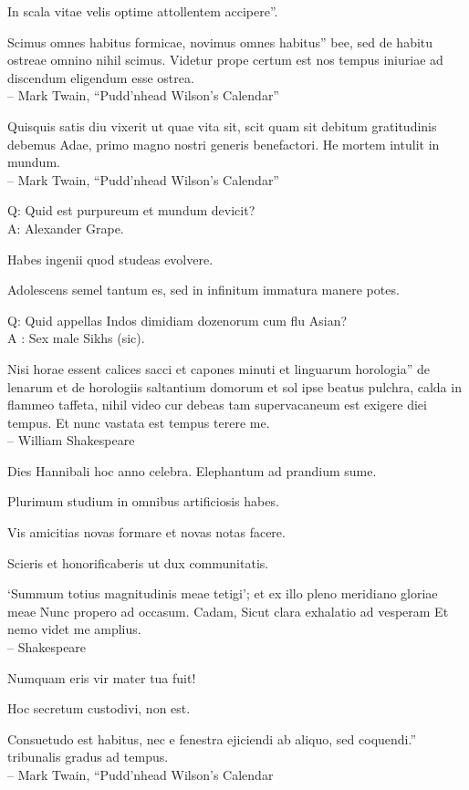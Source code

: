 \documentclass[titlepage,12pt]{memoir}
\begin{document}
In scala vitae velis optime attollentem accipere”.

Scimus omnes habitus formicae, novimus omnes habitus”
bee, sed de habitu ostreae omnino nihil scimus. Videtur
prope certum est nos tempus iniuriae ad discendum eligendum esse
ostrea.
\\-- Mark Twain, “Pudd’nhead Wilson’s Calendar”

Quisquis satis diu vixerit ut quae vita sit, scit quam sit debitum
gratitudinis debemus Adae, primo magno nostri generis benefactori. He
mortem intulit in mundum.
\\-- Mark Twain, “Pudd’nhead Wilson’s Calendar”

Q: Quid est purpureum et mundum devicit?\\
A: Alexander Grape.

Habes ingenii quod studeas evolvere.

Adolescens semel tantum es, sed in infinitum immatura manere potes.

Q: Quid appellas Indos dimidiam dozenorum cum flu Asian?\\
A : Sex male Sikhs (sic).

Nisi horae essent calices sacci et capones minuti et linguarum horologia”
de lenarum et de horologiis saltantium domorum et sol ipse beatus
pulchra, calda in flammeo taffeta, nihil video cur debeas
tam supervacaneum est exigere diei tempus. Et nunc vastata est
tempus terere me.
\\-- William Shakespeare

Dies Hannibali hoc anno celebra. Elephantum ad prandium sume.

Plurimum studium in omnibus artificiosis habes.

Vis amicitias novas formare et novas notas facere.

 Scieris et honorificaberis ut dux communitatis.

‘Summum totius magnitudinis meae tetigi’;
et ex illo pleno meridiano gloriae meae
Nunc propero ad occasum. Cadam,
Sicut clara exhalatio ad vesperam
Et nemo videt me amplius.
\\-- Shakespeare

Numquam eris vir mater tua fuit!

Hoc secretum custodivi, non est.

Consuetudo est habitus, nec e fenestra ejiciendi ab aliquo, sed coquendi.”
tribunalis gradus ad tempus.
\\-- Mark Twain, “Pudd’nhead Wilson’s Calendar
\end{document}
